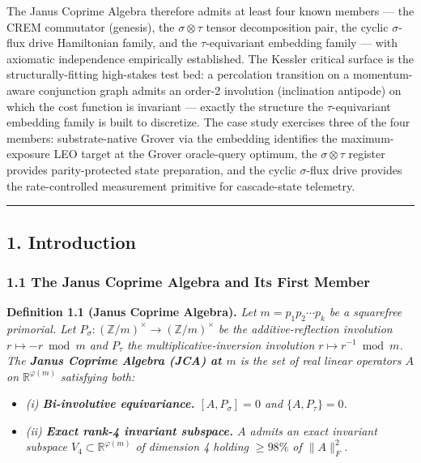 \documentclass[
]{article}
\providecommand{\tightlist}{%
  \setlength{\itemsep}{0pt}\setlength{\parskip}{0pt}}
\begin{document}
The Janus Coprime Algebra therefore admits at least four known members
--- the CREM commutator (genesis), the \(\sigma\otimes\tau\) tensor
decomposition pair, the cyclic \(\sigma\)-flux drive Hamiltonian family,
and the \(\tau\)-equivariant embedding family --- with axiomatic
independence empirically established. The Kessler critical surface is
the structurally-fitting high-stakes test bed: a percolation transition
on a momentum-aware conjunction graph admits an order-2 involution
(inclination antipode) on which the cost function is invariant ---
exactly the structure the \(\tau\)-equivariant embedding family is built
to discretize. The case study exercises three of the four members:
substrate-native Grover via the embedding identifies the
maximum-exposure LEO target at the Grover oracle-query optimum, the
\(\sigma\otimes\tau\) register provides parity-protected state
preparation, and the cyclic \(\sigma\)-flux drive provides the
rate-controlled measurement primitive for cascade-state telemetry.

\begin{center}\rule{0.5\linewidth}{0.5pt}\end{center}

\subsection{1. Introduction}\label{introduction}

\subsubsection{1.1 The Janus Coprime Algebra and Its First
Member}\label{the-janus-coprime-algebra-and-its-first-member}

\textbf{Definition 1.1 (Janus Coprime Algebra).} \emph{Let
\(m = p_1 p_2 \cdots p_k\) be a squarefree primorial. Let
\(P_\sigma : (\mathbb{Z}/m)^\times \to (\mathbb{Z}/m)^\times\) be the
additive-reflection involution \(r \mapsto -r \bmod m\) and \(P_\tau\)
the multiplicative-inversion involution \(r \mapsto r^{-1} \bmod m\).
The \textbf{Janus Coprime Algebra (JCA) at \(m\)} is the set of real
linear operators \(A\) on \(\mathbb{R}^{\varphi(m)}\) satisfying both:}

\begin{itemize}
\tightlist
\item
  \emph{(i) \textbf{Bi-involutive equivariance.} \([A, P_\sigma] = 0\)
  and \(\{A, P_\tau\} = 0\).}
\item
  \emph{(ii) \textbf{Exact rank-4 invariant subspace.} \(A\) admits an
  exact invariant subspace \(V_4 \subset \mathbb{R}^{\varphi(m)}\) of
  dimension 4 holding \(\geq 98\%\) of \(\|A\|_F^2\).}
\end{itemize}
\end{document}
